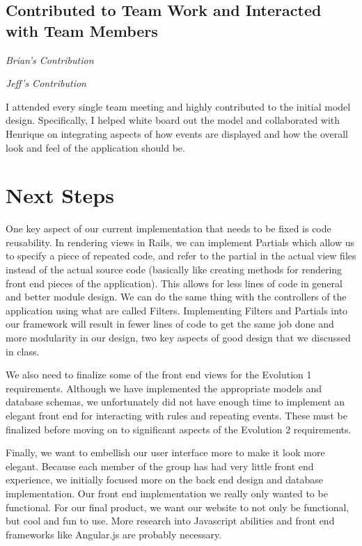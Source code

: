 \documentclass[11pt]{article}
\begin{document}
\subsection{Contributed to Team Work and Interacted with Team Members}

\textit{Brian's Contribution}

\textit{Jeff's Contribution}

I attended every single team meeting and highly contributed to the initial model design.  Specifically, I helped white board out the model and collaborated with Henrique on integrating aspects of how events are displayed and how the overall look and feel of the application should be.

\section{Next Steps}

One key aspect of our current implementation that needs to be fixed is code reusability.  In rendering views in Rails, we can implement Partials which allow us to specify a piece of repeated code, and refer to the partial in the actual view files instead of the actual source code (basically like creating methods for rendering front end pieces of the application).  This allows for less lines of code in general and better module design.  We can do the same thing with the controllers of the application using what are called Filters.  Implementing Filters and Partials into our framework will result in fewer lines of code to get the same job done and more modularity in our design, two key aspects of good design that we discussed in class.

We also need to finalize some of the front end views for the Evolution 1 requirements.  Although we have implemented the appropriate models and database schemas, we unfortunately did not have enough time to implement an elegant front end for interacting with rules and repeating events.  These must be finalized before moving on to significant aspects of the Evolution 2 requirements.

Finally, we want to embellish our user interface more to make it look more elegant.  Because each member of the group has had very little front end experience, we initially focused more on the back end design and database implementation.  Our front end implementation we really only wanted to be functional.  For our final product, we want our website to not only be functional, but cool and fun to use.  More research into Javascript abilities and front end frameworks like Angular.js are probably necessary.
\end{document}
